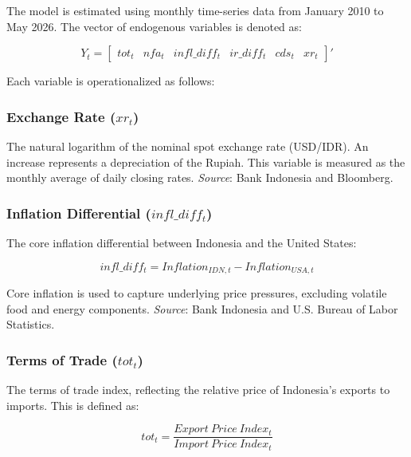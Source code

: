 \documentclass[11pt,a4paper]{article}
\begin{document}
The model is estimated using monthly time-series data from January 2010 to May 2026. The vector of endogenous variables is denoted as:

\begin{equation}
Y_t = \begin{bmatrix} tot_t & nfa_t & infl\_diff_t & ir\_diff_t & cds_t & xr_t \end{bmatrix}'
\label{eq:variable_vector}
\end{equation}

Each variable is operationalized as follows:

\subsubsection{Exchange Rate ($xr_t$)}

The natural logarithm of the nominal spot exchange rate (USD/IDR). An increase represents a depreciation of the Rupiah. This variable is measured as the monthly average of daily closing rates. \textit{Source}: Bank Indonesia and Bloomberg.

\subsubsection{Inflation Differential ($infl\_diff_t$)}

The core inflation differential between Indonesia and the United States:

\begin{equation}
infl\_diff_t = Inflation_{IDN,t} - Inflation_{USA,t}
\label{eq:inflation_differential}
\end{equation}

Core inflation is used to capture underlying price pressures, excluding volatile food and energy components. \textit{Source}: Bank Indonesia and U.S. Bureau of Labor Statistics.

\subsubsection{Terms of Trade ($tot_t$)}

The terms of trade index, reflecting the relative price of Indonesia's exports to imports. This is defined as:

\begin{equation}
tot_t = \frac{Export\ Price\ Index_t}{Import\ Price\ Index_t}
\label{eq:terms_of_trade}
\end{equation}
\end{document}
